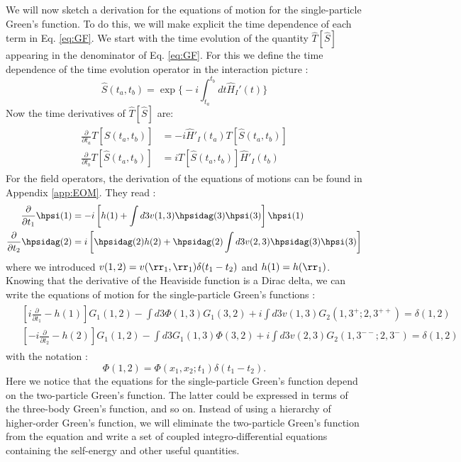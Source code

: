 We will now sketch a derivation for the equations of motion for the single-particle Green's function. To do this, we will make explicit the time dependence of each term in Eq. \eqref{eq:GF}.
We start with the time evolution of the quantity $\hat{T}[\hat{S}]$ appearing in the denominator of Eq. \ref{eq:GF}.
For this we define the time dependence of the time evolution operator in the interaction picture :
\begin{equation}
	\hat{S}(t_a,t_b) = \exp	\biggl\{ -i \int_{t_a}^{t_b} dt \hat{H}_I'(t) \biggr\}
\end{equation}
Now the time derivatives of $\hat{T}[\hat{S}]$ are:
\begin{align}
\begin{split}
	\frac{\partial}{\partial t_a} T[\hat{S}(t_a,t_b)] &= -i \hat{H}'_I(t_a)T[\hat{S}(t_a,t_b)] \\
	\frac{\partial}{\partial t_b} T[\hat{S}(t_a,t_b)] &= i T[\hat{S}(t_a,t_b)]\hat{H}'_I(t_b)
\end{split}
\end{align}
For the field operators, the derivation of the equations of motions can be found in Appendix \ref{app:EOM}. They read :
\begin{align}
\begin{split}
	\frac{\partial}{\partial t_1} \hpsi(1) &= -i \left[ h(1) + \int d3 v(1,3) \hpsidag(3)\hpsi(3) \right] \hpsi(1) \\
	\frac{\partial}{\partial t_2} \hpsidag(2) &= i \left[ \hpsidag(2)h(2) + \hpsidag(2) \int d3 v(2,3) \hpsidag(3)\hpsi(3) \right]
\end{split}	
\end{align}
where we introduced $v(1,2) = v(\rr_1,\rr_1)\delta(t_1-t_2)$ and $h(1)=h(\rr_1)$. Knowing that the derivative of the Heaviside function is a Dirac delta, we can write the equations of motion for the single-particle Green's functions :
\begin{align}
\begin{split}
	&\left[ i\frac{\partial}{\partial t_1} - h(1) \right] G_1(1,2) - \int d3 \Phi(1,3)G_1(3,2) + i \int d3 v(1,3) G_2(1,3^+;2,3^{++}) = \delta(1,2) \\
	&\left[ -i\frac{\partial}{\partial t_2} - h(2) \right] G_1(1,2) - \int d3 G_1(1,3)\Phi(3,2) + i \int d3 v(2,3) G_2(1,3^{--};2,3^-) = \delta(1,2)
\end{split}
\end{align}
with the notation : 
\begin{equation}
	\Phi(1,2) = \Phi(x_1,x_2;t_1) \delta(t_1-t_2).
\end{equation}
Here we notice that the equations for the single-particle Green's function depend on the two-particle Green's function. The latter could be expressed in terms of the three-body Green's function, and so on. Instead of using a hierarchy of higher-order Green's function, we will eliminate the two-particle Green's function from the equation and write a set of coupled integro-differential equations containing the self-energy and other useful quantities.
%

